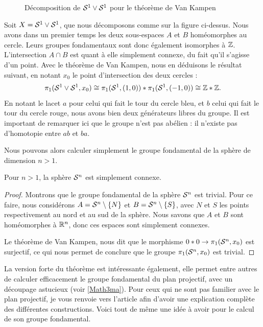 \begin{exemple}
\begin{figure}[H]
    \caption{Décomposition de $\mathcal{S}^{1}\vee\mathcal{S}^{1}$ pour le théorème de Van Kampen}
\end{figure}
Soit $X=\mathcal{S}^{1}\vee\mathcal{S}^{1}$, que nous décomposons comme sur la figure ci-dessus. Nous avons dans un premier temps les deux sous-espaces $A$ et $B$ homéomorphes au cercle. Leurs groupes fondamentaux sont donc également isomorphes à $\mathbb{Z}$. L'intersection $A\cap B$ est quant à elle simplement connexe, du fait qu'il s'agisse d'un point. Avec le théorème de Van Kampen, nous en déduisons le résultat suivant, en notant $x_0$ le point d'intersection des deux cercles : \[\pi_1(\mathcal{S}^{1}\vee\mathcal{S}^{1},x_0)\cong\pi_1(\mathcal{S}^{1},(1,0))\ast\pi_1(\mathcal{S}^{1},(-1,0))\cong\mathbb{Z}\ast\mathbb{Z}.\]En notant le lacet $a$ pour celui qui fait le tour du cercle bleu, et $b$ celui qui fait le tour du cercle rouge, nous avons bien deux générateurs libres du groupe. Il est important de remarquer ici que le groupe n'est pas abélien : il n'existe pas d'homotopie entre $ab$ et $ba$.
\end{exemple}

Nous pouvons alors calculer simplement le groupe fondamental de la sphère de dimension $n>1$.

\begin{proposition}
Pour $n>1$, la sphère $\mathcal{S}^{n}$ est simplement connexe.
\end{proposition}
\begin{proof}
Montrons que le groupe fondamental de la sphère $\mathcal{S}^{n}$ est trivial. Pour ce faire, nous considérons $A=\mathcal{S}^{n}\setminus\{N\}$ et $B=\mathcal{S}^{n}\setminus\{S\}$, avec $N$ et $S$ les points respectivement au nord et au sud de la sphère. Nous savons que $A$ et $B$ sont homéomorphes à $\mathbb{R}^n$, donc ces espaces sont simplement connexes.

Le théorème de Van Kampen, nous dit que le morphisme $0\ast0\to\pi_1(\mathcal{S}^{n},x_0)$ est surjectif, ce qui nous permet de conclure que le groupe $\pi_1(\mathcal{S}^{n},x_0)$ est trivial.
\end{proof}

La version forte du théorème est intéressante également, elle permet entre autres de calculer efficacement le groupe fondamental du plan projectif, avec un découpage astucieux (voir \href{https://www.math3ma.com/blog/the-fundamental-group-of-the-real-projective-plane}{[Math3ma]}). Pour ceux qui ne sont pas familier avec le plan projectif, je vous renvoie vers l'article \cite{Homeo-article} afin d'avoir une explication complète des différentes constructions. Voici tout de même une idée à avoir pour le calcul de son groupe fondamental.

